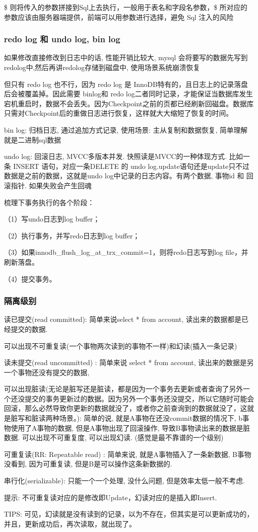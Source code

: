 \$ {} 则将传入的参数拼接到Sql上去执行，一般用于表名和字段名参数，\$ 所对应的参数应该由服务器端提供，前端可以用参数进行选择，避免 Sql 注入的风险
\subsubsection{redo log 和 undo log, bin log }
如果修改直接修改到日志中的话, 性能开销比较大, mysql 会将要写的数据先写到redolog中,然后再讲redolog存储到磁盘中, 使用场景系统崩溃恢复 \par
但只有 redo log 也不行，因为 redo log 是 InnoDB特有的，且日志上的记录落盘后会被覆盖掉。因此需要 binlog和 redo log二者同时记录，才能保证当数据库发生宕机重启时，数据不会丢失。因为Checkpoint之前的页都已经刷新回磁盘。数据库只需对Checkpoint后的重做日志进行恢复，这样就大大缩短了恢复的时间。

bin log: 归档日志, 通过追加方式记录, 使用场景: 主从复制和数据恢复, 简单理解就是二进制sql数据 \par
undo log: 回滚日志, MVCC多版本并发. 快照读是MVCC的一种体现方式.
比如一条 INSERT 语句，对应一条DELETE 的 undo log.update语句还是update只不过数据是之前的数据，这就是undo log中记录的日志内容。有两个数据, 事物id 和 回滚指针. 如果失败会产生回魂


梳理下事务执行的各个阶段：

（1）写undo日志到log buffer；

（2）执行事务，并写redo日志到log buffer；

（3）如果innodb\_flush\_log\_at\_trx\_commit=1，则将redo日志写到log file，并刷新落盘。

（4）提交事务。



\subsubsection{隔离级别}
\par
读已提交(read committed): 简单来说select * from account, 读出来的数据都是已经提交的数据.
\par 可以出现不可重复读(一个事物两次读到的事物不一样)和幻读(插入一条记录)
\par
读未提交(read uncommitted) : 简单来说 select * from account, 读出来的数据是另一个事物还没有提交的数据,
\par 可以出现脏读(无论是脏写还是脏读，都是因为一个事务去更新或者查询了另外一个还没提交的事务更新过的数据。因为另外一个事务还没提交，所以它随时可能会回滚，那么必然导致你更新的数据就没了，或者你之前查询到的数据就没了，这就是脏写和脏读两种场景。): 简单的说, 就是A事物在还没commit数据的情况下, b事物使用了A事物的数据, 但是A事物出现了回滚操作, 导致B事物读出来的数据是脏数据. 可以出现不可重复度, 可以出现幻读. (感觉是最不靠谱的一个级别)
\par
可重复读(RR: Repeatable read) : 简单来说, 就是A事物插入了一条新数据, B事物没看到, 因为可重复读, 但是B是可以操作这条新数据的.
\par
串行化(serializable): 只能一个一个处理, 没什么问题, 但是效率太低一般不考虑.
\par 提示: 不可重复读对应的是修改即Update，幻读对应的是插入即Insert.
\par TIPS:
可见，幻读就是没有读到的记录，以为不存在，但其实是可以更新成功的，并且，更新成功后，再次读取，就出现了。
